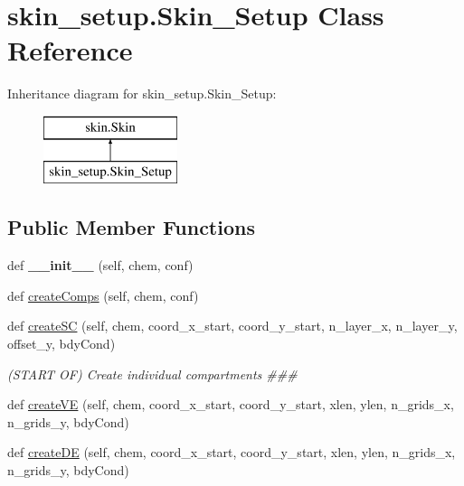 \hypertarget{classskin__setup_1_1Skin__Setup}{}\section{skin\+\_\+setup.\+Skin\+\_\+\+Setup Class Reference}
\label{classskin__setup_1_1Skin__Setup}
Inheritance diagram for skin\+\_\+setup.\+Skin\+\_\+\+Setup\+:\begin{figure}[H]
\begin{center}
\leavevmode
\includegraphics[height=2.000000cm]{classskin__setup_1_1Skin__Setup}
\end{center}
\end{figure}
\subsection*{Public Member Functions}
\begin{DoxyCompactItemize}
\item 
def {\bfseries \+\_\+\+\_\+init\+\_\+\+\_\+} (self, chem, conf)\hypertarget{classskin__setup_1_1Skin__Setup_a2611544358a7178751abaf0d2d98c931}{}\label{classskin__setup_1_1Skin__Setup_a2611544358a7178751abaf0d2d98c931}

\item 
def \hyperlink{classskin__setup_1_1Skin__Setup_aeb7289f58a76638e31e24e71ae186309}{create\+Comps} (self, chem, conf)
\item 
def \hyperlink{classskin__setup_1_1Skin__Setup_a080759893083f543703f6b4f17ae6260}{create\+SC} (self, chem, coord\+\_\+x\+\_\+start, coord\+\_\+y\+\_\+start, n\+\_\+layer\+\_\+x, n\+\_\+layer\+\_\+y, offset\+\_\+y, bdy\+Cond)
\begin{DoxyCompactList}\small\item\em (S\+T\+A\+RT OF) Create individual compartments \#\#\# \end{DoxyCompactList}\item 
def \hyperlink{classskin__setup_1_1Skin__Setup_a0271f9e73005e8c52c3b397edb534881}{create\+VE} (self, chem, coord\+\_\+x\+\_\+start, coord\+\_\+y\+\_\+start, xlen, ylen, n\+\_\+grids\+\_\+x, n\+\_\+grids\+\_\+y, bdy\+Cond)
\item 
def \hyperlink{classskin__setup_1_1Skin__Setup_a147ae38354fa1c30b2cb6b911a785e19}{create\+DE} (self, chem, coord\+\_\+x\+\_\+start, coord\+\_\+y\+\_\+start, xlen, ylen, n\+\_\+grids\+\_\+x, n\+\_\+grids\+\_\+y, bdy\+Cond)
\end{DoxyCompactItemize}
